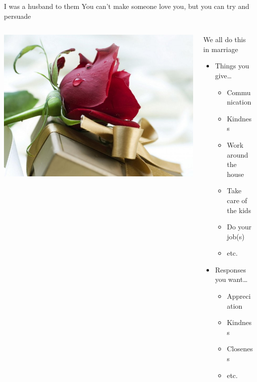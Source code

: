 \begin{frame}{I was a husband to them}
You can't make someone love you, but you can try and persuade
\begin{columns}[c]
\begin{column}{0.5\textwidth}
	\includegraphics[width=\columnwidth]{figures/rose.jpg}
\end{column}
\begin{column}{0.5\textwidth}
  We all do this in marriage
	\begin{itemize}
    \item Things you give\ldots
		\begin{itemize}
			\item Communication
			\item Kindness
			\item Work around the house
      \item Take care of the kids
			\item Do your job(s)
			\item etc.
		\end{itemize}
    \item Responses you want\ldots
		\begin{itemize}
      \item Appreciation
      \item Kindness
      \item Closeness
			\item etc.
		\end{itemize}
	\end{itemize}
\end{column}
\end{columns}

\end{frame}

